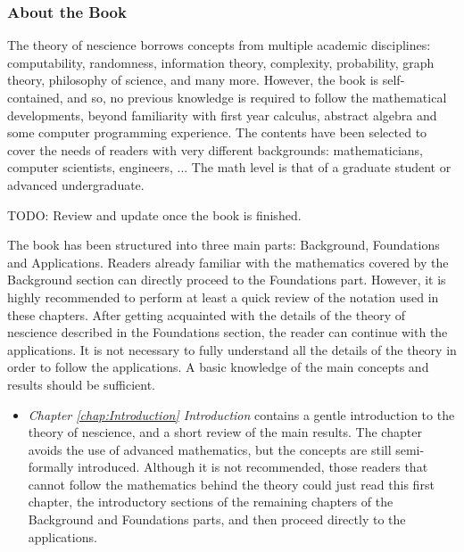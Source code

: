%
%

\subsubsection*{About the Book}

The theory of nescience borrows concepts from multiple academic disciplines: computability, randomness, information theory, complexity, probability, graph theory, philosophy of science, and many more. However, the book is self-contained, and so, no previous knowledge is required to follow the mathematical developments, beyond familiarity with first year calculus, abstract algebra and some computer programming experience. The contents have been selected to cover the needs of readers with very different backgrounds: mathematicians, computer scientists, engineers, ... The math level is that of a graduate student or advanced undergraduate.

{\color{red} TODO: Review and update once the book is finished.}

The book has been structured into three main parts: Background, Foundations and Applications. Readers already familiar with the mathematics covered by the Background section can directly proceed to the Foundations part. However, it is highly recommended to perform at least a quick review of the notation used in these chapters. After getting acquainted with the details of the theory of nescience described in the Foundations section, the reader can continue with the applications. It is not necessary to fully understand all the details of the theory in order to follow the applications. A basic knowledge of the main concepts and results should be sufficient.

\bigskip

\begin{itemize}

\item \emph{Chapter \ref{chap:Introduction} Introduction} contains a gentle introduction to the theory of nescience, and a short review of the main results. The chapter avoids the use of advanced mathematics, but the concepts are still semi-formally introduced. Although it is not recommended, those readers that cannot follow the mathematics behind the theory could just read this first chapter, the introductory sections of the remaining chapters of the Background and Foundations parts, and then proceed directly to the applications.

\end{itemize}

